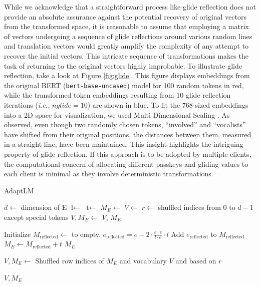 \documentclass[letterpaper]{article} %
\begin{document}
While we acknowledge that a straightforward process like glide reflection does not provide an absolute assurance against the potential recovery of original vectors from the transformed space, it is reasonable to assume that employing a matrix of vectors undergoing a sequence of glide reflections around various random lines and translation vectors would greatly amplify the complexity of any attempt to recover the initial vectors. This intricate sequence of transformations makes the task of returning to the original vectors highly improbable. To illustrate glide reflection, take a look at Figure \ref{fig:glide}. This figure displays embeddings from the original BERT (\texttt{bert-base-uncased}) model for 100 random tokens in red, while the transformed token embeddings resulting from 10 glide reflection iterations (\textit{i.e.,} $nglide = 10$) are shown in blue. To fit the 768-sized embeddings into a 2D space for visualization, we used Multi Dimensional Scaling \cite{kruskal1978multidimensional}. As observed, even though two randomly chosen tokens, ``involved'' and ``vocalists'' have shifted from their original positions, the distances between them, measured in a straight line, have been maintained. This insight highlights the intriguing property of glide reflection. If this approach is to be adopted by multiple clients, the computational concern of allocating different passkeys and gliding values to each client is minimal as they involve deterministic transformations.
\begin{algorithm}[t]
\caption{AdaptLM}
\label{alg:encrypt}
\begin{algorithmic}[1]
\footnotesize
{}
  \State $d \gets $ dimension of E
    \State $\text{l} \gets$ 
    \State $\text{t} \gets$ 
    \State $M_{E} \gets$ 
  \EndFor
    \State $V \gets$ 
    \State $r \gets$ shuffled indices from 0 to $d-1$ except special tokens
    \State $V, M_{E} \gets$ 
  \State \Return $V$, $M_{E}$
\EndFunction

    \State Initialize $M_{\text{reflected}} \gets$ to empty.
        \State $e_{\text{reflected}} = e - 2 \cdot \frac{e \cdot e}{l \cdot e} \cdot l$
        \State Add $e_{\text{reflected}}$ to $M_{\text{reflected}}$
    \EndFor
    \State $M_E \gets M_{\text{reflected}} + t$
    \State \Return $M_E$
\EndFunction

  \State $V, M_{E} \gets$ Shuffled row indices of $M_{E}$ and vocabulary $V$ and based on $r$

  \State \Return $V, M_{E}$
\EndFunction
\end{algorithmic}
\end{algorithm}
\end{document}
